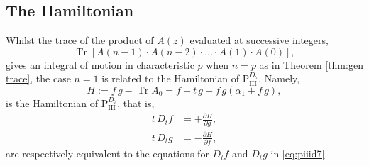 \documentclass[a4paper,reqno]{amsart}
\numberwithin{equation}{section}
\numberwithin{figure}{section}
\theoremstyle{remark}
\newcommand\Pthree{\textrm{P}_{\textrm{III}}}
\begin{document}
\subsection{The Hamiltonian}Whilst the trace of the product of $A(z)$ evaluated at successive integers,
$$\operatorname{Tr}[A(n-1)\cdot A(n-2)\cdot\ldots\cdot A(1)\cdot A(0)],$$
gives an integral of motion in characteristic $p$ when $n=p$ as in Theorem \ref{thm:gen trace}, the case $n=1$ is related to the Hamiltonian of $\Pthree^{D_7}$. Namely,
\begin{equation*}
    H:=f\,g-\operatorname{Tr}A_0=f+t\,g+f\,g(\alpha_1+f\,g),
\end{equation*}
is the Hamiltonian of $\Pthree^{D_7}$, that is,
\begin{align*}
    t\,D_tf&=+\frac{\partial H}{\partial g},\\
    t\,D_tg&=-\frac{\partial H}{\partial f},
\end{align*}
are respectively equivalent to the equations for $D_tf$ and $D_tg$ in \eqref{eq:piiid7}.
\end{document}
